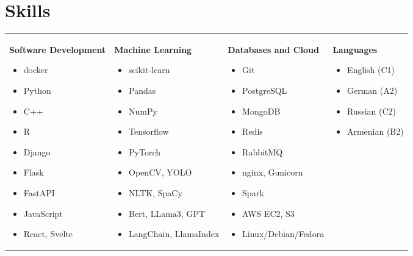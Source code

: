 \documentclass{ExpressiveResume}
\begin{document}
\section{Skills}
\noindent\begin{tabularx}{\textwidth}{@{}X@{}X@{}X@{}X@{}}
\textbf{Software Development}
\begin{itemize}
    \item docker
    \item Python
    \item C++
    \item R
    \item Django
    \item Flask
    \item FastAPI
    \item JavaScript
    \item React, Svelte
\end{itemize}
&
\textbf{Machine Learning}
\begin{itemize}
    \item scikit-learn
    \item Pandas
    \item NumPy
    \item Tensorflow
    \item PyTorch
    \item OpenCV, YOLO
    \item NLTK, SpaCy
    \item Bert, LLama3, GPT
    \item LangChain, LlamaIndex
\end{itemize}
&
\textbf{Databases and Cloud}
\begin{itemize}
    \item Git
    \item PostgreSQL
    \item MongoDB
    \item Redis
    \item RabbitMQ
    \item nginx, Gunicorn
    \item Spark
    \item AWS EC2, S3
    \item Linux/Debian/Fedora
\end{itemize}
&
\textbf{Languages}
\begin{itemize}
    \item English (C1)
    \item German (A2)
    \item Russian (C2)
    \item Armenian (B2)
\end{itemize}
\end{tabularx}
\end{document}

